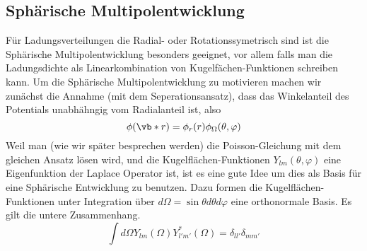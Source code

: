 \subsection{Sphärische Multipolentwicklung}%
\label{ssub:sphaerische-Multipolentwicklung}
Für Ladungsverteilungen die Radial- oder Rotationssymetrisch sind ist die 
Sphärische Multipolentwicklung besonders geeignet, vor allem falls man die 
Ladungsdichte als Linearkombination von Kugelfächen-Funktionen schreiben 
kann. Um die Sphärische Multipolentwicklung zu motivieren machen wir 
zunächst die Annahme (mit dem Seperationsansatz), dass das 
Winkelanteil des Potentials unabhähngig vom Radialanteil ist, also
\begin{equation*}
  \phi(\vb*r) = \phi_r(r)\phi_\Omega(\theta,\varphi)
\end{equation*}
Weil man (wie wir später besprechen werden) die Poisson-Gleichung mit dem
gleichen Ansatz lösen wird, und die Kugelflächen-Funktionen 
$Y_{lm}(\theta,\varphi)$ eine Eigenfunktion der Laplace Operator ist, 
ist es eine gute Idee um dies als Basis für eine Sphärische Entwicklung 
zu benutzen. Dazu formen die Kugelflächen-Funktionen unter Integration über
$d\Omega=\sin\theta d\theta d\varphi$ eine orthonormale Basis. Es gilt die untere Zusammenhang.
\begin{equation*}
  \int d\Omega Y_{lm}(\Omega)Y^*_{l'm'}(\Omega)=\delta_{ll'}\delta_{mm'}
\end{equation*}

